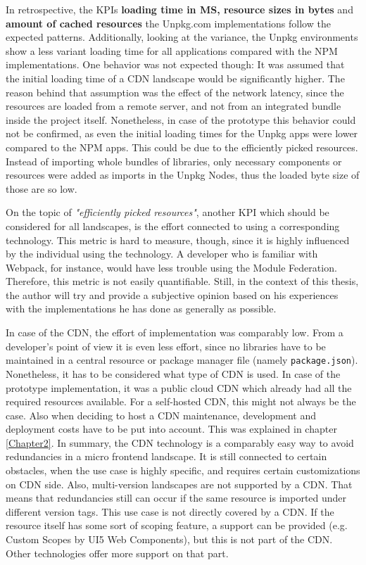 In retrospective, the KPIs \textbf{loading time in MS, resource sizes in bytes} and \textbf{amount of cached resources} the Unpkg.com implementations follow the expected patterns. 
Additionally, looking at the variance, the Unpkg environments show a less variant loading time for all applications compared with the NPM implementations. 
One behavior was not expected though: It was assumed that the initial loading time of a CDN landscape would be significantly higher. 
The reason behind that assumption was the effect of the network latency, since the resources are loaded from a remote server, and not from an integrated bundle inside the project itself. 
Nonetheless, in case of the prototype this behavior could not be confirmed, as even the initial loading times for the Unpkg apps were lower compared to the NPM apps. 
This could be due to the efficiently picked resources. 
Instead of importing whole bundles of libraries, only necessary components or resources were added as imports in the Unpkg Nodes, thus the loaded byte size of those are so low.

On the topic of \textit{"efficiently picked resources"}, another KPI which should be considered for all landscapes, is the effort connected to using a corresponding technology. 
This metric is hard to measure, though, since it is highly influenced by the individual using the technology. 
A developer who is familiar with Webpack, for instance, would have less trouble using the Module Federation. 
Therefore, this metric is not easily quantifiable. 
Still, in the context of this thesis, the author will try and provide a subjective opinion based on his experiences with the implementations he has done as generally as possible. 

In case of the CDN, the effort of implementation was comparably low. 
From a developer's point of view it is even less effort, since no libraries have to be maintained in a central resource or package manager file (namely \texttt{package.json}). 
Nonetheless, it has to be considered what type of CDN is used.
In case of the prototype implementation, it was a public cloud CDN which already had all the required resources available. 
For a self-hosted CDN, this might not always be the case. 
Also when deciding to host a CDN maintenance, development and deployment costs have to be put into account. 
This was explained in chapter \ref{Chapter2}.
In summary, the CDN technology is a comparably easy way to avoid redundancies in a micro frontend landscape.
It is still connected to certain obstacles, when the use case is highly specific, and requires certain customizations on CDN side. 
Also, multi-version landscapes are not supported by a CDN. 
That means that redundancies still can occur if the same resource is imported under different version tags. 
This use case is not directly covered by a CDN. 
If the resource itself has some sort of scoping feature, a support can be provided (e.g. Custom Scopes by UI5 Web Components), but this is not part of the CDN. 
Other technologies offer more support on that part.

